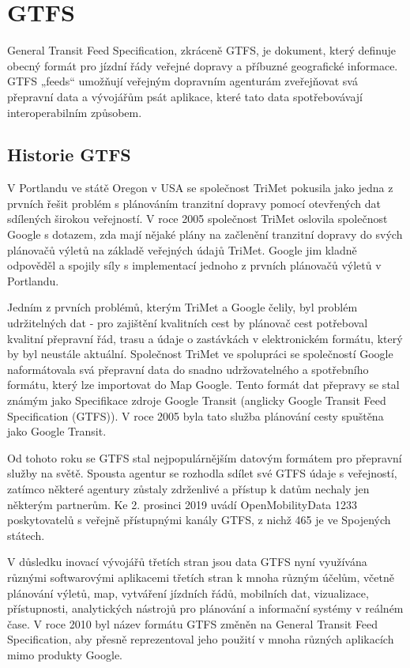 \chapter{GTFS}
\label{2-teorie-gtfs}

General Transit Feed Specification, zkráceně GTFS, je dokument, který definuje
obecný formát pro jízdní řády veřejné dopravy a příbuzné geografické informace.
GTFS „feeds“ umožňují veřejným dopravním agenturám zveřejňovat svá přepravní
data a vývojářům psát aplikace, které tato data spotřebovávají interoperabilním
způsobem. \cite{gtfs-info}

\section{Historie GTFS}
V Portlandu ve státě Oregon v USA se společnost TriMet pokusila jako jedna z prvních 
řešit problém s plánováním tranzitní dopravy pomocí otevřených dat sdílených širokou veřejností.
V roce 2005 společnost TriMet oslovila společnost Google s dotazem, zda mají nějaké plány
na začlenění tranzitní dopravy do svých plánovačů výletů na základě veřejných údajů TriMet.
Google jim kladně odpověděl a spojily síly s implementací jednoho z prvních plánovačů výletů v Portlandu.

Jedním z prvních problémů, kterým TriMet a Google čelily, byl problém udržitelných dat 
- pro zajištění kvalitních cest by plánovač cest potřeboval kvalitní přepravní řád, 
trasu a údaje o zastávkách v elektronickém formátu, který by byl neustále aktuální. 
Společnost TriMet ve spolupráci se společností Google naformátovala svá přepravní 
data do snadno udržovatelného a spotřebního formátu, který lze importovat do Map Google. 
Tento formát dat přepravy se stal známým jako Specifikace zdroje Google Transit (anglicky
Google Transit Feed Specification (GTFS)). 
V roce 2005 byla tato služba plánování cesty spuštěna jako Google Transit.

Od tohoto roku se GTFS stal nejpopulárnějším datovým formátem pro přepravní služby na světě. 
Spousta agentur se rozhodla sdílet své GTFS údaje s veřejností, zatímco některé agentury 
zůstaly zdrženlivé a přístup k datům nechaly jen některým partnerům. Ke 2. prosinci 2019
uvádí OpenMobilityData 1233 poskytovatelů s veřejně přístupnými kanály GTFS,
z nichž 465 je ve Spojených státech. 

V důsledku inovací vývojářů třetích stran jsou data GTFS nyní využívána různými softwarovými aplikacemi
třetích stran k mnoha různým účelům, včetně plánování výletů, map, vytváření jízdních řádů, mobilních dat,
vizualizace, přístupnosti, analytických nástrojů pro plánování a informační systémy v reálném čase.
V roce 2010 byl název formátu GTFS změněn na General Transit Feed Specification,
aby přesně reprezentoval jeho použití v mnoha různých aplikacích mimo produkty Google. \cite{transitwiki} 

